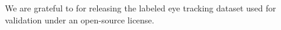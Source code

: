 \begin{acknowledgements}


We are grateful to \cite{Andersson2017} for releasing the labeled eye tracking
dataset used for validation under an open-source license.

\end{acknowledgements}












\clearpage
\listoftodos


